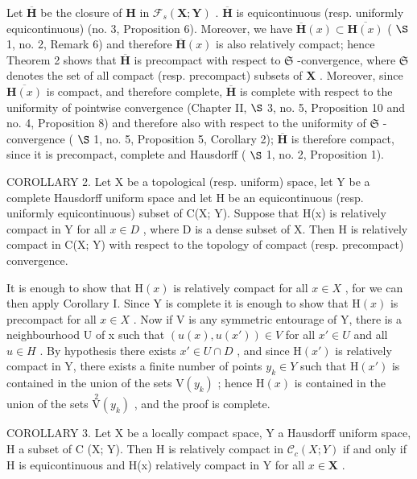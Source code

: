 Let \(\overline{\mathbf{H}}\) be the closure of \(\mathbf{H}\) in \(\mathcal{F}_s(\mathbf{X};\mathbf{Y})\) . \(\overline{\mathbf{H}}\) is equicontinuous (resp. uniformly equicontinuous) (no. 3, Proposition 6). Moreover, we have \(\overline{\mathbf{H}}(x)\subset \overline{\mathbf{H}(x)}\) ( \(\S\) 1, no. 2, Remark 6) and therefore \(\overline{\mathbf{H}}(x)\) is also relatively compact; hence Theorem 2 shows that \(\overline{\mathbf{H}}\) is precompact with respect to \(\mathfrak{S}\) -convergence, where \(\mathfrak{S}\) denotes the set of all compact (resp. precompact) subsets of \(\mathbf{X}\) . Moreover, since \(\overline{\mathbf{H}(x)}\) is compact, and therefore complete, \(\overline{\mathbf{H}}\) is complete with respect to the uniformity of pointwise convergence (Chapter II, \(\S\) 3, no. 5, Proposition 10 and no. 4, Proposition 8) and therefore also with respect to the uniformity of \(\mathfrak{S}\) -convergence ( \(\S\) 1, no. 5, Proposition 5, Corollary 2); \(\overline{\mathbf{H}}\) is therefore compact, since it is precompact, complete and Hausdorff ( \(\S\) 1, no. 2, Proposition 1).

COROLLARY 2. Let X be a topological (resp. uniform) space, let Y be a complete Hausdorff uniform space and let H be an equicontinuous (resp. uniformly equicontinuous) subset of C(X; Y). Suppose that H(x) is relatively compact in Y for all \(x \in D\) , where D is a dense subset of X. Then H is relatively compact in C(X; Y) with respect to the topology of compact (resp. precompact) convergence.

It is enough to show that \(\mathrm{H}(x)\) is relatively compact for all \(x \in X\) , for we can then apply Corollary I. Since Y is complete it is enough to show that \(\mathrm{H}(x)\) is precompact for all \(x \in X\) . Now if V is any symmetric entourage of Y, there is a neighbourhood U of x such that \((u(x), u(x')) \in V\) for all \(x' \in U\) and all \(u \in H\) . By hypothesis there exists \(x' \in U \cap D\) , and since \(\mathrm{H}(x')\) is relatively compact in Y, there exists a finite number of points \(y_k \in Y\) such that \(\mathrm{H}(x')\) is contained in the union of the sets \(\mathrm{V}(y_k)\) ; hence \(\mathrm{H}(x)\) is contained in the union of the sets \(\overset{2}{\mathrm{V}}(y_k)\) , and the proof is complete.

COROLLARY 3. Let X be a locally compact space, Y a Hausdorff uniform space, H a subset of C (X; Y). Then H is relatively compact in \(\mathcal{C}_c(X; Y)\) if and only if H is equicontinuous and H(x) relatively compact in Y for all \(x \in \mathbf{X}\) .

